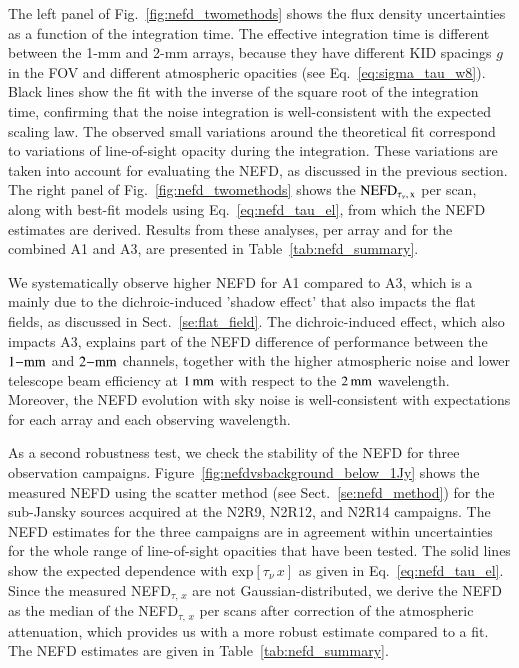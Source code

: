 \documentclass[traditionalabstract]{aa}
\newcommand{\taunu}{\tau_{\nu}}
\begin{document}
{The left panel of Fig.~\ref{fig:nefd_twomethods} shows the flux density
uncertainties as a function of the integration time. The effective
integration time is different between the 1-mm and 2-mm arrays,
because they have different KID spacings $g$ in the FOV and different
atmospheric opacities (see Eq.~\ref{eq:sigma_tau_w8}). Black lines show
the fit with the inverse of the square root of the integration time,
confirming that the noise integration is well-consistent with the expected
scaling law. The observed small variations around the theoretical fit
correspond to variations of line-of-sight opacity during the
integration. These variations are taken into account for evaluating the NEFD, as
discussed in the previous section. The right panel of
Fig.~\ref{fig:nefd_twomethods} shows the
$\rm{NEFD}_{\taunu,\, x}$ per scan, along with best-fit models using
Eq.~\ref{eq:nefd_tau_el}, from which the \rm{NEFD} estimates are derived. 
Results from these analyses, per array and for the
combined A1 and A3, are presented in Table~\ref{tab:nefd_summary}.

We systematically observe higher NEFD for A1 compared to A3, which is a mainly
due to the dichroic-induced 'shadow effect' that also impacts the flat fields,
as discussed in Sect.~\ref{se:flat_field}.  The dichroic-induced effect, which
also impacts A3, explains part of the NEFD difference of performance between the $1\rm{-mm}$
and $2\rm{-mm}$ channels, together with the higher atmospheric noise and lower
telescope beam efficiency at $1\, \rm{mm}$ with respect to the $2\,\rm{mm}$
wavelength. Moreover, the NEFD evolution with sky noise is well-consistent with expectations for each array and each observing wavelength.

As a second robustness test, we check the stability of the NEFD for
three observation campaigns. Figure~\ref{fig:nefdvsbackground_below_1Jy} shows the
measured NEFD using the scatter method (see Sect.~\ref{se:nefd_method}) for the
sub-Jansky sources acquired at the N2R9, N2R12, and N2R14
campaigns. The NEFD estimates for the
three campaigns are in agreement within uncertainties for the whole
range of line-of-sight opacities that have been tested.
The solid lines show the expected dependence with
exp${[\taunu\,x]}$ as given in Eq.~\ref{eq:nefd_tau_el}. %
Since the measured NEFD$_{\tau,\, x}$ are not Gaussian-distributed, we
derive the NEFD as the median of the NEFD$_{\tau,\, x}$
per scans after correction of the atmospheric attenuation, which provides us
with a more robust estimate compared to a fit. The NEFD estimates
are given in Table~\ref{tab:nefd_summary}.

}
\end{document}
